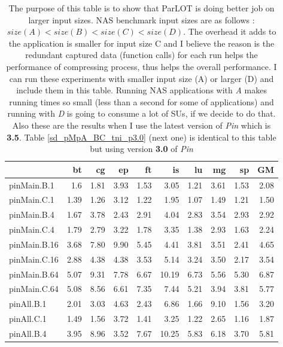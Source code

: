 \begin{table*}[]
\caption{The purpose of this table is to show that ParLOT is doing better job on larger input sizes. NAS benchmark input sizes are as follows : $size(A) < size(B) < size (C) < size(D) $. The overhead it adds to the application is smaller for input size C and I believe the reason is the redundant captured data (function calls) for each run helps the performance of compressing process, thus helps the overall performance. I can run these experiments with smaller input size (A) or larger (D) and include them in this table. Running NAS applications with \textit{A} makes running times so small (less than a second for some of applications) and running with \textit{D} is going to consume a lot of SUs, if we decide to do that. Also these are the results when I use the latest version of \textit{Pin} which is \textbf{3.5}. Table \ref{sd_pMpA_BC_tni_p3.0} (next one) is identical to this table but using version \textbf{3.0} of \textit{Pin}}
 \label{sd_pMpA_BC_tni_p3.5}
\begin{center}
\begin{tabular}{|l|rrrrrrrr|r|}
\hline
              &   bt &    cg &   ep &   ft &    is &   lu &   mg &   sp &   GM \\
\hline
 pinMain.B.1  &  1.6 &  1.81 & 3.93 & 1.53 &  3.05 & 1.21 & 3.61 & 1.53 & 2.08 \\
 pinMain.C.1  & 1.39 &  1.26 & 3.12 & 1.22 &  1.95 & 1.07 & 1.49 & 1.21 &  1.50 \\
 \hline
 pinMain.B.4  & 1.67 &  3.78 & 2.43 & 2.91 &  4.04 & 2.83 & 3.54 & 2.93 & 2.92 \\
 pinMain.C.4  & 1.79 &  2.79 & 3.22 & 1.78 &  3.35 & 1.38 & 2.93 & 1.63 & 2.24 \\
 \hline
 pinMain.B.16 & 3.68 &   7.80 &  9.90 & 5.45 &  4.41 & 3.81 & 3.51 & 2.41 & 4.65 \\
 pinMain.C.16 & 2.88 &  4.38 & 4.38 & 3.53 &  5.14 & 3.24 &  3.50 & 2.17 & 3.54 \\
 \hline
 pinMain.B.64 & 5.07 &  9.31 & 7.78 & 6.67 & 10.19 & 6.73 & 5.56 &  5.30 & 6.87 \\
 pinMain.C.64 & 5.08 &  8.56 & 6.61 & 7.35 &  7.44 & 5.21 & 3.94 & 3.81 & 5.77 \\
 \hline
 pinAll.B.1   & 2.01 &  3.03 & 4.63 & 2.43 &  6.86 & 1.66 &  9.10 & 1.56 &  3.20 \\
 pinAll.C.1   & 1.49 &  1.56 & 3.72 & 1.41 &  3.25 & 1.22 & 2.65 & 1.16 & 1.87 \\
 \hline
 pinAll.B.4   & 3.95 &  8.96 & 3.52 & 7.67 & 10.25 & 5.83 & 6.18 &  3.70 & 5.81 \\

\end{tabular}
\end{center}
\end{table*}
